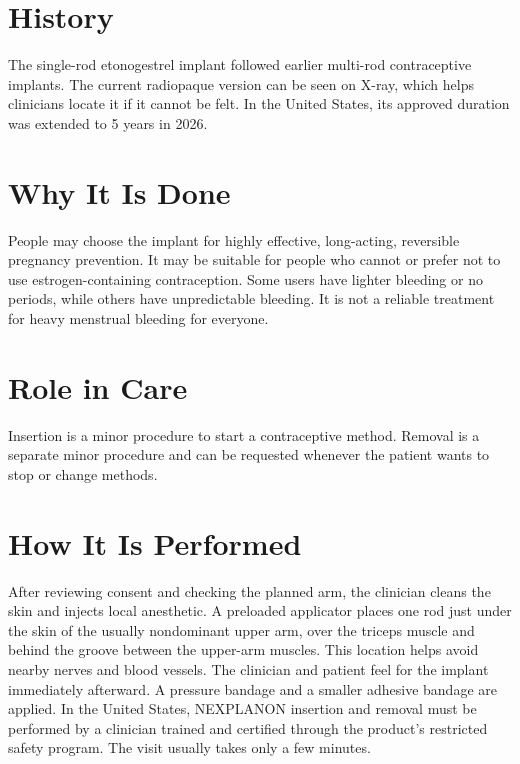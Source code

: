 \section*{History}
The single-rod etonogestrel implant followed earlier multi-rod contraceptive implants. The current radiopaque version can be seen on X-ray, which helps clinicians locate it if it cannot be felt. In the United States, its approved duration was extended to 5 years in 2026.

\section*{Why It Is Done}
People may choose the implant for highly effective, long-acting, reversible pregnancy prevention. It may be suitable for people who cannot or prefer not to use estrogen-containing contraception. Some users have lighter bleeding or no periods, while others have unpredictable bleeding. It is not a reliable treatment for heavy menstrual bleeding for everyone.

\section*{Role in Care}
Insertion is a minor procedure to start a contraceptive method. Removal is a separate minor procedure and can be requested whenever the patient wants to stop or change methods.

\section*{How It Is Performed}
After reviewing consent and checking the planned arm, the clinician cleans the skin and injects local anesthetic. A preloaded applicator places one rod just under the skin of the usually nondominant upper arm, over the triceps muscle and behind the groove between the upper-arm muscles. This location helps avoid nearby nerves and blood vessels. The clinician and patient feel for the implant immediately afterward. A pressure bandage and a smaller adhesive bandage are applied. In the United States, NEXPLANON insertion and removal must be performed by a clinician trained and certified through the product's restricted safety program. The visit usually takes only a few minutes.

